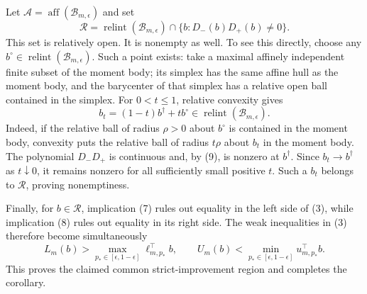 Let \(\mathcal A=\operatorname{aff}(\mathcal B_{m,\epsilon})\) and set
\[
 \mathcal R=
 \operatorname{relint}(\mathcal B_{m,\epsilon})
 \cap\{b:D_-(b)D_+(b)\neq0\}.                                      \tag{10}
\]
This set is relatively open. It is nonempty as well. To see this directly,
choose any \(b^\circ\in\operatorname{relint}(\mathcal B_{m,\epsilon})\).
Such a point exists: take a maximal affinely independent finite subset of the
moment body; its simplex has the same affine hull as the moment body, and the
barycenter of that simplex has a relative open ball contained in the simplex.
For
\(0<t\leq1\), relative convexity gives
\[
 b_t=(1-t)b^\dagger+t b^\circ
 \in\operatorname{relint}(\mathcal B_{m,\epsilon}).
\]
Indeed, if the relative ball of radius \(\rho>0\) about \(b^\circ\) is
contained in the moment body, convexity puts the relative ball of radius
\(t\rho\) about \(b_t\) in the moment body.
The polynomial \(D_-D_+\) is continuous and, by (9), is nonzero at
\(b^\dagger\). Since \(b_t\to b^\dagger\) as \(t\downarrow0\), it remains
nonzero for all sufficiently small positive \(t\). Such a \(b_t\) belongs to
\(\mathcal R\), proving nonemptiness.

Finally, for \(b\in\mathcal R\), implication (7) rules out equality in the
left side of (3), while implication (8) rules out equality in its right side.
The weak inequalities in (3) therefore become simultaneously
\[
 L_m(b)>\max_{p_*\in[\epsilon,1-\epsilon]}\ell_{m,p_*}^{\top}b,
 \qquad
 U_m(b)<\min_{p_*\in[\epsilon,1-\epsilon]}u_{m,p_*}^{\top}b.
\]
This proves the claimed common strict-improvement region and completes the
corollary.